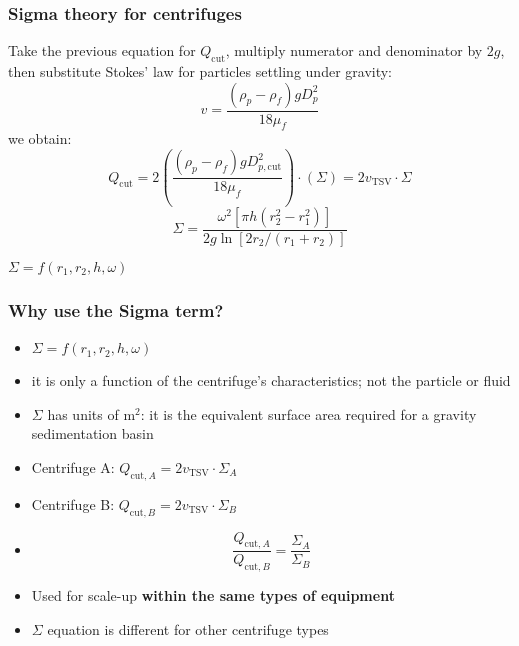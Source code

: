\begin{frame}\frametitle{Sigma theory for centrifuges}
	Take the previous equation for $Q_\text{cut}$, multiply numerator and denominator by $2g$, then substitute Stokes' law for particles settling under gravity:
	\[
		v = \frac{\left( \rho_p - \rho_f \right) g D_p^2}{18 \mu_f}
	\]
	we obtain:
	\[
		Q_\text{cut} =  2\left( \frac{\left( \rho_p - \rho_f \right) g D_{p,\text{cut}}^2}{18 \mu_f}  \right) \cdot ( \Sigma ) = 2 v_\text{TSV} \cdot \Sigma
	\]
	\[
		\Sigma = \frac{\omega^2 \left[\pi h \left(r_2^2 - r_1^2\right)\right]}{2g \ln \left[2r_2/(r_1+r_2) \right]} 
	\]
	
	\vspace{12pt}
	$\Sigma = f(r_1, r_2, h, \omega)$
\end{frame}

\begin{frame}\frametitle{Why use the Sigma term?}
	\begin{itemize}
		\item	$\Sigma = f(r_1, r_2, h, \omega)$
		\item	it is only a function of the centrifuge's characteristics; not the particle or fluid
		\item	$\Sigma$ has units of $\text{m}^2$: it is the equivalent surface area required for a gravity sedimentation basin
		\item	Centrifuge A: $Q_{\text{cut},A} = 2 v_\text{TSV} \cdot \Sigma_A$
		\item	Centrifuge B: $Q_{\text{cut},B} = 2 v_\text{TSV} \cdot \Sigma_B$
		\item	\[
					\frac{Q_{\text{cut},A}}{Q_{\text{cut},B}}  = \frac{\Sigma_A}{\Sigma_B}
				\]
		\item	Used for scale-up \textbf{within the same types of equipment}
		\item	$\Sigma$ equation is different for other centrifuge types				
	\end{itemize}	
\end{frame}

